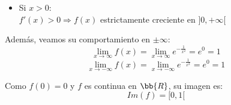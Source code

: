 \begin{ejercicio}
\begin{itemize}
        \item Si $x>0$:\\
            $f'(x)>0 \Longrightarrow f(x)$ estrictamente creciente en $]0, +\infty[$
    \end{itemize}
    Además, veamos su comportamiento en $\pm \infty$:
    \begin{equation*}
        \lim_{x\to\infty}f(x)=\lim_{x\to\infty}e^{-\frac{1}{x^2}} = e^0 = 1
    \end{equation*}
    \begin{equation*}
        \lim_{x\to -\infty}f(x)=\lim_{x\to -\infty}e^{-\frac{1}{x^2}} = e^0 = 1
    \end{equation*}

    Como $f(0)=0$ y $f$ es continua en $\bb{R}$, su imagen es:
    \begin{equation*}
        Im(f)=[0, 1[
    \end{equation*}
\end{ejercicio}

